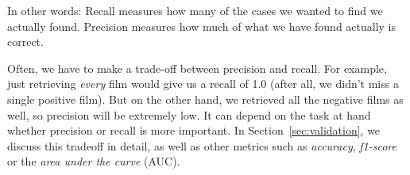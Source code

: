 In other words: Recall measures how many of the cases we wanted to
find we actually found. Precision measures how much of what we have
found actually is correct.

Often, we have to make a trade-off between precision and recall. For
example, just retrieving \emph{every} film would give us a recall of
1.0 (after all, we didn't miss a single positive film). But on the
other hand, we retrieved all the negative films as well, so precision
will be extremely low. It can depend on the task at hand whether
precision or recall is more important. In
Section~\ref{sec:validation}, we discuss this tradeoff in detail, as well as other metrics such as \emph{accuracy}, \emph{f1-score} or the \emph{area under the curve} (AUC).
